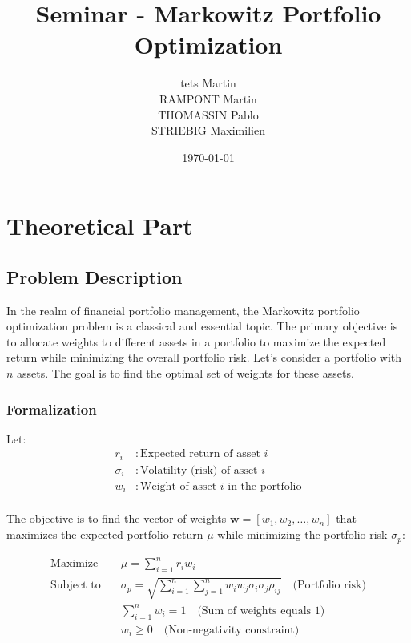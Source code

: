 \documentclass[12pt]{article}
\title{Seminar - Markowitz Portfolio Optimization}
\author{tets Martin \\ RAMPONT Martin \\ THOMASSIN Pablo \\ STRIEBIG Maximilien}
\date{\today}
\begin{document}
\maketitle

\section*{Theoretical Part}

\subsection*{Problem Description}

In the realm of financial portfolio management, the Markowitz portfolio optimization problem is a classical and essential topic. The primary objective is to allocate weights to different assets in a portfolio to maximize the expected return while minimizing the overall portfolio risk. Let's consider a portfolio with $n$ assets. The goal is to find the optimal set of weights for these assets.

\subsubsection*{Formalization}

Let:
\begin{align*}
    r_i      & : \text{Expected return of asset } i                 \\
    \sigma_i & : \text{Volatility (risk) of asset } i               \\
    w_i      & : \text{Weight of asset } i \text{ in the portfolio} \\
\end{align*}

The objective is to find the vector of weights $\mathbf{w} = [w_1, w_2, \ldots, w_n]$ that maximizes the expected portfolio return $\mu$ while minimizing the portfolio risk $\sigma_p$:

\begin{equation}
    \begin{aligned}
        \text{Maximize} \quad   & \mu = \sum_{i=1}^{n} r_i w_i                                                                                     \\
        \text{Subject to} \quad & \sigma_p = \sqrt{\sum_{i=1}^{n}\sum_{j=1}^{n} w_i w_j \sigma_i \sigma_j \rho_{ij}} \quad \text{(Portfolio risk)} \\
                                & \sum_{i=1}^{n} w_i = 1 \quad \text{(Sum of weights equals 1)}                                                    \\
                                & w_i \geq 0 \quad \text{(Non-negativity constraint)}
    \end{aligned}
\end{equation}
\end{document}
